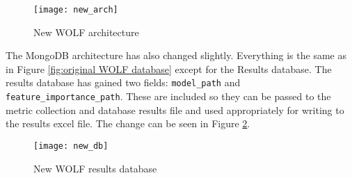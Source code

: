 \begin{figure}[H]
	\centering
	\texttt{[image: new\_arch]}
	\caption{New WOLF architecture}
	\label{fig:new WOLF workflow}
\end{figure}

The MongoDB architecture has also changed slightly. Everything is the same as in Figure \ref{fig:original WOLF database} except for the Results database. The results database has gained two fields: {\tt model\_path} and {\tt feature\_importance\_path}. These are included so they can be passed to the metric collection and database results file and used appropriately for writing to the results excel file. The change can be seen in Figure \ref{fig:new WOLF database}.

\begin{figure}[H]
	\centering
	\texttt{[image: new\_db]}
	\caption{New WOLF results database}
	\label{fig:new WOLF database}
\end{figure}